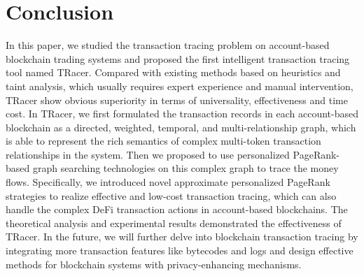 \section{Conclusion}
\label{sec:conclusion}
In this paper, we studied the transaction tracing problem on account-based blockchain trading systems and proposed the first intelligent transaction tracing tool named TRacer. Compared with existing methods based on heuristics and taint analysis, which usually requires expert experience and manual intervention, TRacer show obvious superiority in terms of universality, effectiveness and time cost. In TRacer, we first formulated the transaction records in each account-based blockchain as a directed, weighted, temporal, and multi-relationship graph, which is able to represent the rich semantics of complex multi-token transaction relationships in the system. Then we proposed to use personalized PageRank-based graph searching technologies on this complex graph to trace the money flows. Specifically, we introduced novel approximate personalized PageRank strategies to realize effective and low-cost transaction tracing, which can also handle the complex DeFi transaction actions in account-based blockchains. The theoretical analysis and experimental results demonstrated the effectiveness of TRacer. 
In the future, we will further delve into blockchain transaction tracing by integrating more transaction features like bytecodes and logs and design effective methods for blockchain systems with privacy-enhancing mechanisms.
